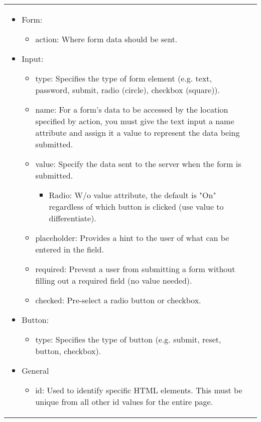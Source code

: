 \begin{summary}
\begin{center}
\begin{tabular}{ll}
{\begin{itemize}
\begin{itemize}
\begin{itemize}
                    \end{itemize}
                    \item Form:
                    \begin{itemize}
                        \item action: Where form data should be sent. 
                    \end{itemize}
                    \item Input: 
                    \begin{itemize}
                        \item type: Specifies the type of form element (e.g. text, password, submit, radio (circle), checkbox (square)).
                        \item name: For a form's data to be accessed by the location specified by action, you must give the text input a name attribute and assign it a value to represent the data being submitted.
                        \item value: Specify the data sent to the server when the form is submitted.
                        \begin{itemize}
                            \item  Radio: W/o value attribute, the default is "On" regardless of which button is clicked (use value to differentiate).
                        \end{itemize}
                        \item placeholder: Provides a hint to the user of what can be entered in the field.
                        \item required: Prevent a user from submitting a form without filling out a required field (no value needed).
                        \item checked: Pre-select a radio button or checkbox.
                    \end{itemize}
                    \item Button:
                    \begin{itemize}
                        \item type: Specifies the type of button (e.g. submit, reset, button, checkbox).
                    \end{itemize}
                    \item General
                    \begin{itemize}
                        \item id: Used to identify specific HTML elements. This must be unique from all other id values for the entire page. 

\end{itemize}
\end{itemize}
\end{itemize}}
\end{tabular}
\end{center}
\end{summary}
